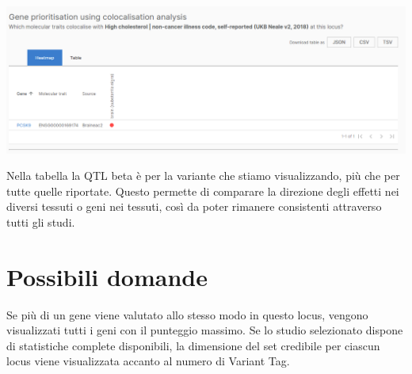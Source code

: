 \documentclass{article}
\begin{document}
\begin{center}
    \includegraphics[width=1\textwidth]{figures/StudyLocus3.png}
\end{center}
Nella tabella la QTL beta è per la variante che stiamo visualizzando, più che per tutte quelle riportate. Questo permette di comparare la direzione degli effetti nei diversi tessuti o geni nei tessuti, così da poter rimanere consistenti attraverso tutti gli studi.

\section{Possibili domande}
Se più di un gene viene valutato allo stesso modo in questo locus, vengono visualizzati tutti i geni con il punteggio massimo. Se lo studio selezionato dispone di statistiche complete disponibili, la dimensione del set credibile per ciascun locus viene visualizzata accanto al numero di Variant Tag.
\end{document}
